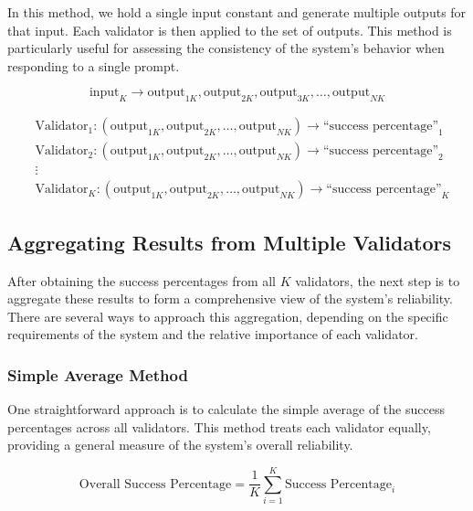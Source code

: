 \documentclass{article}
\begin{document}
In this method, we hold a single input constant and generate multiple outputs for that input. Each validator is then applied to the set of outputs. This method is particularly useful for assessing the consistency of the system’s behavior when responding to a single prompt.

\begin{equation*}
\text{input}_K \rightarrow \text{output}_{1K}, \text{output}_{2K}, \text{output}_{3K}, \ldots, \text{output}_{NK}
\end{equation*}

\begin{equation*}
\begin{aligned}
&\text{Validator}_1: (\text{output}_{1K}, \text{output}_{2K}, \ldots, \text{output}_{NK}) \rightarrow \text{``success percentage''}_1 \\
&\text{Validator}_2: (\text{output}_{1K}, \text{output}_{2K}, \ldots, \text{output}_{NK}) \rightarrow \text{``success percentage''}_2 \\
&\vdots \\
&\text{Validator}_K: (\text{output}_{1K}, \text{output}_{2K}, \ldots, \text{output}_{NK}) \rightarrow \text{``success percentage''}_K
\end{aligned}
\end{equation*}

\subsection{Aggregating Results from Multiple Validators}

After obtaining the success percentages from all \( K \) validators, the next step is to aggregate these results to form a comprehensive view of the system's reliability. There are several ways to approach this aggregation, depending on the specific requirements of the system and the relative importance of each validator.

\subsubsection{Simple Average Method}
One straightforward approach is to calculate the simple average of the success percentages across all validators. This method treats each validator equally, providing a general measure of the system’s overall reliability.

\begin{equation*}
\text{Overall Success Percentage} = \frac{1}{K} \sum_{i=1}^{K} \text{Success Percentage}_i
\end{equation*}
\end{document}
